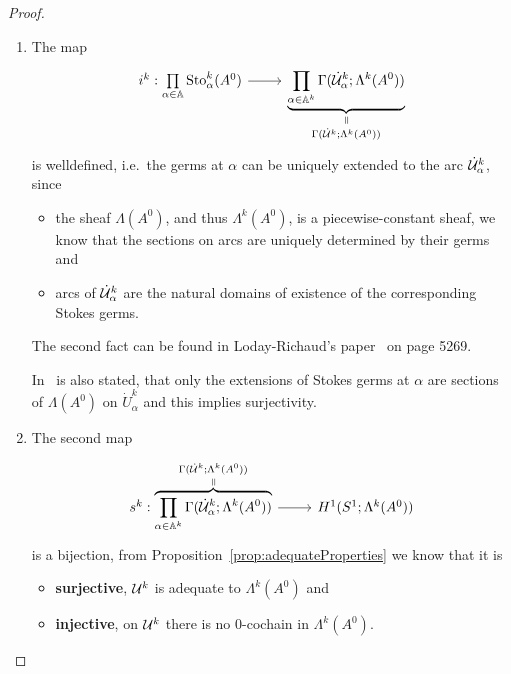 \begin{proof}
  \begin{enumerate}
  \item The map
    \[ \begin{tikzcd}
      i^k: \underset{\alpha\in\A}\prod\Sto_\alpha^k(A^0)
      \rar &
      \underset{\Gamma(\dot\cU^k;\Lambda^k(A^0))}{%
        \underset{\text{\rotatebox[origin=c]{-90}{$=$}}}{%
          \underbrace{%
            \prod_{\alpha\in\A^k}\Gamma(\dot\cU_\alpha^k;\Lambda^k(A^0))
          }
        }}
    \end{tikzcd} \]
    is welldefined, i.e.\ the germs at $\alpha$ can be uniquely
    extended to the arc $\dot{\mathcal{U}}_\alpha^k$, since
    \begin{itemize}
    \item the sheaf $\Lambda(A^0)$, and thus $\Lambda^k(A^0)$, is a
      piecewise-constant sheaf, we know that the sections on arcs are uniquely
      determined by their germs and
    \item arcs of $\dot{\mathcal{U}}_\alpha^k$ are the natural domains of existence of the
      corresponding Stokes germs.
    \end{itemize}
    The second fact can be found in Loday-Richaud's paper~\cite{Loday2004} on
    page 5269.

    In~\cite[5269]{Loday2004} is also stated, that only the extensions of Stokes
    germs at $\alpha$ are sections of $\Lambda(A^0)$ on $\dot U_\alpha^k$ and
    this implies surjectivity.
  \item The second map
    \[ \begin{tikzcd}
      s^k:
      \overset{\Gamma(\dot\cU^k;\Lambda^k(A^0))}{%
        \overset{\text{\rotatebox[origin=c]{-90}{$=$}}}{%
          \overbrace{%
            \prod_{\alpha\in\A^k}\Gamma(\dot\cU_\alpha^k;\Lambda^k(A^0))}}}
      \rar &
      H^1(S^1;\Lambda^k(A^0))
    \end{tikzcd} \]
    is a bijection,  from
    Proposition~\ref{prop:adequateProperties} we know that it is
    \begin{itemize}
    \item \textbf{surjective},  $\mathcal{U}^k$ is adequate to
      $\Lambda^k(A^0)$ and
    \item \textbf{injective},  on $\mathcal{U}^k$ there is no
      $0$-cochain in $\Lambda^k(A^0)$.
    \end{itemize}
  \end{enumerate}
  \PROBLEM[Naturality?]
\end{proof}


